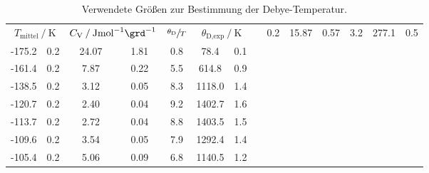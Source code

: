 \begin{table}
    \centering
    \caption{Verwendete Größen zur Bestimmung der Debye-Temperatur.}
    \label{tab:theta}
    \begin{tabular}{S[table-format=3.2] @{${}\pm{}$} S
                    S[table-format=2.2] @{${}\pm{}$} S[table-format=1.2]
                    S
                    S[table-format=4.1] @{${}\pm{}$} S}
    \toprule
         &
         &
        {$\sfrac{\theta_\text{D}}{T}$} &
         &
     & 0.2 & 15.87 & 0.57 & 3.2 & 277.1 & 0.5 \\
    -175.2 & 0.2 & 24.07 & 1.81 & 0.8 & 78.4 & 0.1 \\
    -161.4 & 0.2 & 7.87 & 0.22 & 5.5 & 614.8 & 0.9 \\
    -138.5 & 0.2 & 3.12 & 0.05 & 8.3 & 1118.0 & 1.4 \\
    -120.7 & 0.2 & 2.40 & 0.04 & 9.2 & 1402.7 & 1.6 \\
    -113.7 & 0.2 & 2.72 & 0.04 & 8.8 & 1403.5 & 1.5 \\
    -109.6 & 0.2 & 3.54 & 0.05 & 7.9 & 1292.4 & 1.4 \\
    -105.4 & 0.2 & 5.06 & 0.09 & 6.8 & 1140.5 & 1.2 \\
    \end{tabular}
\end{table}
